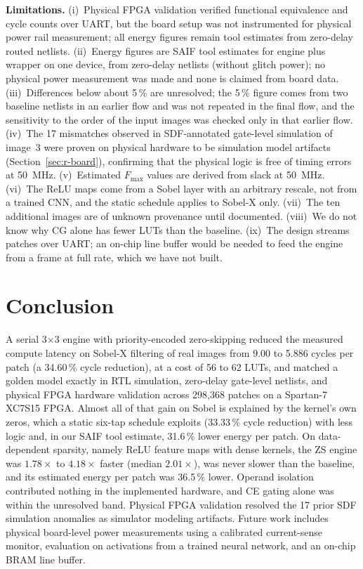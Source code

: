 \documentclass[11pt,journal,draftclsnofoot,onecolumn]{IEEEtran}
\begin{document}
\textbf{Limitations.}
(i)~Physical FPGA validation verified functional equivalence and cycle counts over UART,
but the board setup was not instrumented for physical power rail measurement; all energy
figures remain tool estimates from zero-delay routed netlists.
(ii)~Energy figures are SAIF tool estimates for engine plus wrapper on one device, from
zero-delay netlists (without glitch power); no physical power measurement was made and
none is claimed from board data.
(iii)~Differences below about 5\,\% are unresolved; the 5\,\% figure comes from two
baseline netlists in an earlier flow and was not repeated in the final flow, and the
sensitivity to the order of the input images was checked only in that earlier flow.
(iv)~The 17 mismatches observed in SDF-annotated gate-level simulation of image~3 were
proven on physical hardware to be simulation model artifacts (Section~\ref{sec:r-board}),
confirming that the physical logic is free of timing errors at 50~MHz.
(v)~Estimated $F_{\max}$ values are derived from slack at 50~MHz.
(vi)~The ReLU maps come from a Sobel layer with an arbitrary rescale, not from a trained
CNN, and the static schedule applies to Sobel-X only.
(vii)~The ten additional images are of unknown provenance until documented.
(viii)~We do not know why CG alone has fewer LUTs than the baseline.
(ix)~The design streams patches over UART; an on-chip line buffer would be needed to feed
the engine from a frame at full rate, which we have not built.

\section{Conclusion}\label{sec:concl}
A serial 3$\times$3 engine with priority-encoded zero-skipping reduced the measured
compute latency on Sobel-X filtering of real images from 9.00 to 5.886 cycles per
patch (a 34.60\,\% cycle reduction), at a cost of 56 to 62 LUTs, and matched a golden
model exactly in RTL simulation, zero-delay gate-level netlists, and physical FPGA
hardware validation across 298{,}368 patches on a Spartan-7 XC7S15 FPGA. Almost all of
that gain on Sobel is explained by the kernel's own zeros, which a static six-tap schedule
exploits (33.33\,\% cycle reduction) with less logic and, in our SAIF tool estimate,
31.6\,\% lower energy per patch. On data-dependent sparsity, namely ReLU feature maps
with dense kernels, the ZS engine was $1.78\times$ to $4.18\times$ faster (median
$2.01\times$), was never slower than the baseline, and its estimated energy per patch
was 36.5\,\% lower. Operand isolation contributed nothing in the implemented hardware,
and CE gating alone was within the unresolved band. Physical FPGA validation resolved
the 17 prior SDF simulation anomalies as simulator modeling artifacts. Future work
includes physical board-level power measurements using a calibrated current-sense monitor,
evaluation on activations from a trained neural network, and an on-chip BRAM line buffer.
\end{document}
